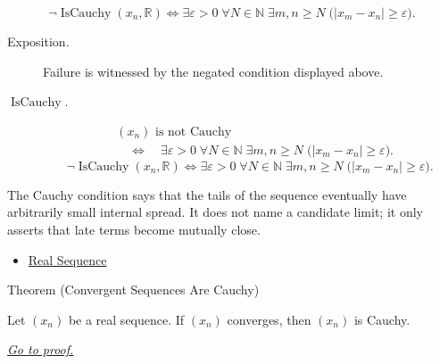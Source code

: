 \begin{remark*}
\[
\neg\operatorname{IsCauchy}(x_n,\mathbb{R})
\Longleftrightarrow
\exists \varepsilon>0 \;\forall N\in\mathbb{N}\;\exists m,n\ge N
\;\bigl(|x_m-x_n|\ge\varepsilon\bigr).
\]
\end{remark*}
\begin{remark*}
\begin{description}
  \item[Exposition.]
Failure is witnessed by the negated condition displayed above.
  \item[\(\operatorname{IsCauchy}.\)]
\[
\begin{aligned}
&(x_n)\text{ is not Cauchy}\\
&\quad\Longleftrightarrow\quad
\exists \varepsilon>0 \;\forall N\in\mathbb{N}\;\exists m,n\ge N
\;\bigl(|x_m-x_n|\ge\varepsilon\bigr).
\end{aligned}
\]
\[
\neg\operatorname{IsCauchy}(x_n,\mathbb{R})
\Longleftrightarrow
\exists \varepsilon>0 \;\forall N\in\mathbb{N}\;\exists m,n\ge N
\;\bigl(|x_m-x_n|\ge\varepsilon\bigr).
\]
\end{description}
\end{remark*}

\begin{remark*}[Interpretation]
The Cauchy condition says that the tails of the sequence eventually have
arbitrarily small internal spread. It does not name a candidate limit; it
only asserts that late terms become mutually close.
\end{remark*}

\begin{dependencies}
\begin{itemize}
  \item \hyperref[def:real-sequence]{Real Sequence}
\end{itemize}
\end{dependencies}


\begin{theorembox}{Theorem (Convergent Sequences Are Cauchy)}
\begin{theorem}
\label{thm:convergent-sequences-are-cauchy}
Let $(x_n)$ be a real sequence. If $(x_n)$ converges, then $(x_n)$ is
Cauchy.

\smallskip
\noindent
\hyperref[prf:convergent-sequences-are-cauchy]{\textit{Go to proof.}}
\end{theorem}
\end{theorembox}

